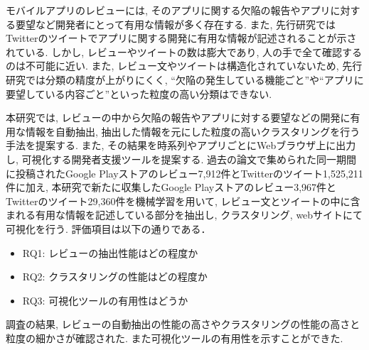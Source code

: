 
モバイルアプリのレビューには, そのアプリに関する欠陥の報告やアプリに対する要望など開発者にとって有用な情報が多く存在する. また, 先行研究ではTwitterのツイートでアプリに関する開発に有用な情報が記述されることが示されている. しかし, レビューやツイートの数は膨大であり, 人の手で全て確認するのは不可能に近い. 
また, レビュー文やツイートは構造化されていないため, 先行研究では分類の精度が上がりにくく, ``欠陥の発生している機能ごと''や``アプリに要望している内容ごと''といった粒度の高い分類はできない. 

本研究では, レビューの中から欠陥の報告やアプリに対する要望などの開発に有用な情報を自動抽出, 抽出した情報を元にした粒度の高いクラスタリングを行う手法を提案する. また, その結果を時系列やアプリごとにWebブラウザ上に出力し, 可視化する開発者支援ツールを提案する.
過去の論文で集められた同一期間に投稿されたGoogle Playストアのレビュー7,912件とTwitterのツイート1,525,211件に加え, 本研究で新たに収集したGoogle Playストアのレビュー3,967件とTwitterのツイート29,360件を機械学習を用いて, レビュー文とツイートの中に含まれる有用な情報を記述している部分を抽出し, クラスタリング, webサイトにて可視化を行う. 評価項目は以下の通りである．
\begin{itemize}
    \item RQ1: レビューの抽出性能はどの程度か
    \item RQ2: クラスタリングの性能はどの程度か
    \item RQ3: 可視化ツールの有用性はどうか
\end{itemize}

調査の結果, レビューの自動抽出の性能の高さやクラスタリングの性能の高さと粒度の細かさが確認された. また可視化ツールの有用性を示すことができた. 
